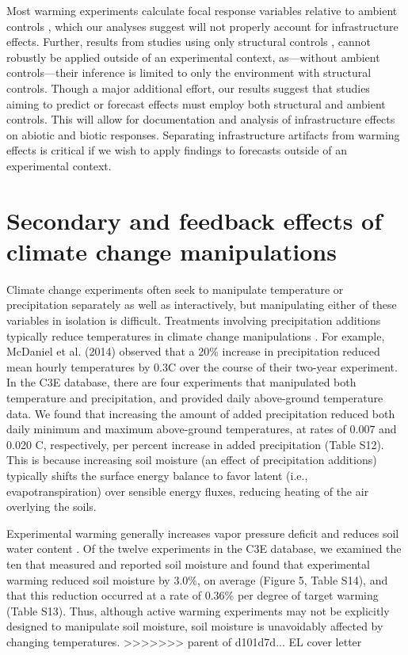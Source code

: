 \documentclass{article}
\begin{document}
\par Most warming experiments calculate focal response variables relative to ambient controls \citep [e.g.,][]{price1998,dunne2003,cleland2006,morin2010,marchin2015}, which our analyses suggest will not properly account for infrastructure effects. Further, results from studies using only structural controls \citep [e.g.,][]{sherry2007,hoeppner2012, rollinson2012}, cannot robustly be applied outside of an experimental context, as---without ambient controls---their inference is limited to only the environment with structural controls. Though a major additional effort, our results suggest that studies aiming to predict or forecast effects must employ both structural and ambient controls. This will allow for documentation and analysis of infrastructure effects on abiotic and biotic responses. Separating infrastructure artifacts from warming effects is critical if we wish to apply findings to forecasts outside of an experimental context. 
\section* {Secondary and feedback effects of climate change manipulations} 
Climate change experiments often seek to manipulate temperature or precipitation separately as well as interactively, but manipulating either of these variables in isolation is difficult.  Treatments involving precipitation additions typically reduce temperatures in climate change manipulations \citep{sherry2007,rollinson2012,mcdaniel2014}. For example, McDaniel et al. (2014) observed that a 20\% increase in precipitation reduced mean hourly temperatures by 0.3\degree C over the course of their two-year experiment. In the C3E database, there are four experiments that manipulated both temperature and precipitation, and provided daily above-ground temperature data. We found that increasing the amount of added precipitation reduced both daily minimum and maximum above-ground temperatures, at rates of 0.007 and 0.020 \degree C, respectively, per percent increase in added precipitation (Table S12). This is because increasing soil moisture (an effect of precipitation additions) typically shifts the surface energy balance to favor latent (i.e., evapotranspiration) over sensible energy fluxes, reducing heating of the air overlying the soils. 
\par Experimental warming generally increases vapor pressure deficit and reduces soil water content \citep[e.g.,][]{sherry2007,morin2010,pelini2014,templer2016}. Of the twelve experiments in the C3E database, we examined the ten that measured and reported soil moisture and found that experimental warming reduced soil moisture by 3.0\%, on average (Figure 5, Table S14), and that this reduction occurred at a rate of 0.36\% per degree of target warming (Table S13). Thus, although active warming experiments may not be explicitly designed to manipulate soil moisture, soil moisture is unavoidably affected by changing temperatures.
>>>>>>> parent of d101d7d... EL cover letter
\end{document}
